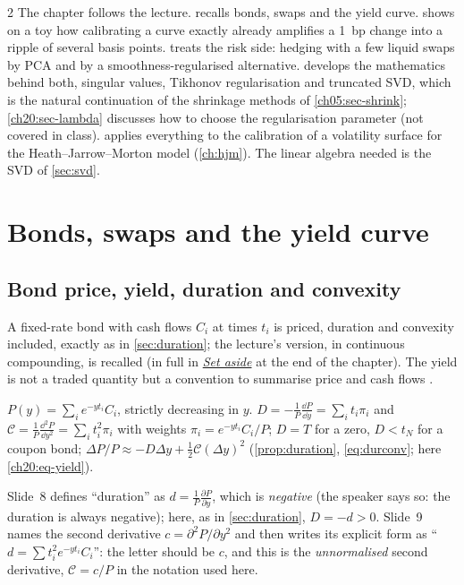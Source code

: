 \begin{paracol}{2}
The chapter follows the lecture.  recalls bonds, swaps and the yield curve. 
shows on a toy how calibrating a curve exactly already amplifies a 1~bp change into a ripple of several
basis points.  treats the risk side: hedging with a few liquid swaps by PCA and by a smoothness-regularised
alternative.  develops the mathematics behind both, singular values, Tikhonov regularisation and
truncated SVD, which is the natural continuation of the shrinkage methods of \cref{ch05:sec-shrink}; \cref{ch20:sec-lambda}
discusses how to choose the regularisation parameter (not covered in class).  applies everything
to the calibration of a volatility surface for the Heath--Jarrow--Morton model (\cref{ch:hjm}). The linear algebra needed is
the SVD of \cref{sec:svd}.

\section{Bonds, swaps and the yield curve}\label{ch20:sec-bonds}

\subsection{Bond price, yield, duration and convexity}\label{ch20:sec-yield}
A fixed-rate bond with cash flows $C_i$ at times $t_i$ is priced, duration and convexity included, exactly as in \cref{sec:duration}; the lecture's version, in continuous compounding, is recalled \inmargin{} (in full in \hyperref[ch20:sec-setaside]{\emph{Set aside}} at the end of the chapter). The yield is not a traded quantity but a convention to summarise price and cash flows .
\begin{recall}
$P(y)=\sum_ie^{-yt_i}C_i$, strictly decreasing in $y$. $D=-\frac1P\frac{\dd P}{\dd y}=\sum_it_i\pi_i$ and $\mathcal C=\frac1P\frac{\dd^2P}{\dd y^2}=\sum_it_i^2\pi_i$ with weights $\pi_i=e^{-yt_i}C_i/P$; $D=T$ for a zero, $D<t_N$ for a coupon bond; $\Delta P/P\approx-D\Delta y+\frac12\mathcal C(\Delta y)^2$ (\cref{prop:duration}, \cref{eq:durconv}; here \eqref{ch20:eq-yield}).
\end{recall}

\begin{coursenote}
Slide~8 defines ``duration'' as $d=\frac1P\frac{\partial P}{\partial y}$, which is \emph{negative} (the speaker says so:
the duration is always negative); here, as in \cref{sec:duration}, $D=-d>0$. Slide~9 names the second derivative $c=\partial^2P/\partial y^2$
and then writes its explicit form as ``$d=\sum t_i^2e^{-yt_i}C_i$'': the letter should be $c$, and this is the
\emph{unnormalised} second derivative, $\mathcal C=c/P$ in the notation used here.
\end{coursenote}


\end{paracol}

